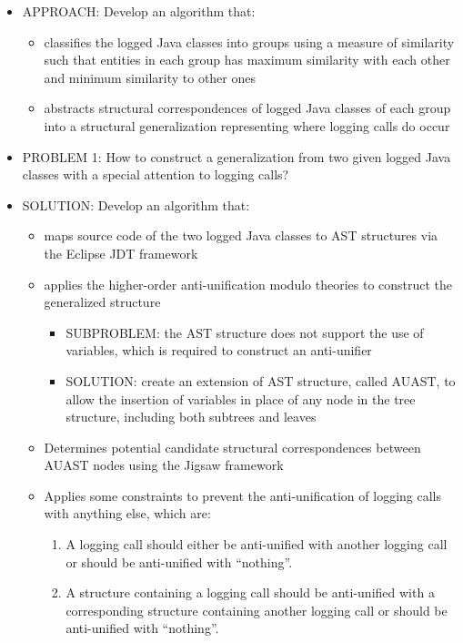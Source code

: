 \documentclass{article}
\newcommand{\tsc}{\textsc}
\newcommand{\nothing}{{``nothing''}}
\begin{document}
\begin{itemize} [leftmargin=.1in]
\item \tsc{APPROACH: }Develop an algorithm that:
\begin{itemize} [leftmargin=.1in]
\item classifies the logged Java classes into groups using a measure of similarity such that entities in each group has maximum similarity with each other and minimum similarity to other ones
\item abstracts structural correspondences of logged Java classes of each group into a structural generalization representing where logging calls do occur
\end{itemize}

\item \tsc{PROBLEM 1: }How to construct a generalization from two given logged Java classes with a special attention to logging calls?
\item \tsc{SOLUTION: }Develop an algorithm that:
\begin{itemize} [leftmargin=.1in]
\item maps source code of the two logged Java classes to AST structures via the Eclipse JDT framework
\item applies the higher-order anti-unification modulo theories to construct the generalized structure
\begin{itemize}
\item \tsc{SUBPROBLEM: }the AST structure does not support the use of variables, which is required to construct an anti-unifier
\item \tsc{SOLUTION: }create an extension of AST structure, called AUAST, to allow the insertion of variables in place of any node in the tree structure, including both subtrees and leaves
\end{itemize}
\item Determines potential candidate structural correspondences between AUAST nodes using the Jigsaw framework
\item Applies some constraints to prevent the anti-unification of logging calls with anything else, which are:
\begin{enumerate} [leftmargin=.2in]
\item A logging call should either be anti-unified with another logging call or should be anti-unified with \nothing.
\item A structure containing a logging call should be anti-unified with a corresponding structure containing another logging call or should be anti-unified with \nothing.
\end{enumerate}

\end{itemize}
\end{itemize}
\end{document}

